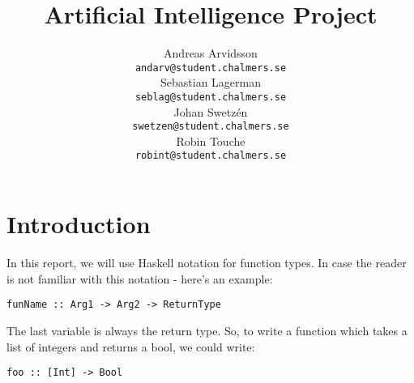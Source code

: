 \documentclass[11pt]{article}
\title{Artificial Intelligence Project}
\author{Andreas Arvidsson \\
  {\tt andarv@student.chalmers.se} \\
  Sebastian Lagerman \\
  {\tt seblag@student.chalmers.se} \\
  Johan Swetz\'{e}n \\
  {\tt swetzen@student.chalmers.se} \\
  Robin Touche \\
  {\tt robint@student.chalmers.se} \\}
\date{}
\begin{document}
\maketitle









\section*{Introduction}

In this report, we will use Haskell notation for function types.
In case the reader is not familiar with this notation - here's an example:

\begin{lstlisting}
funName :: Arg1 -> Arg2 -> ReturnType
\end{lstlisting}

The last variable is always the return type. So, to write a function which takes a list of integers and returns a bool, we could write:

\begin{lstlisting}
foo :: [Int] -> Bool
\end{lstlisting}
\end{document}

